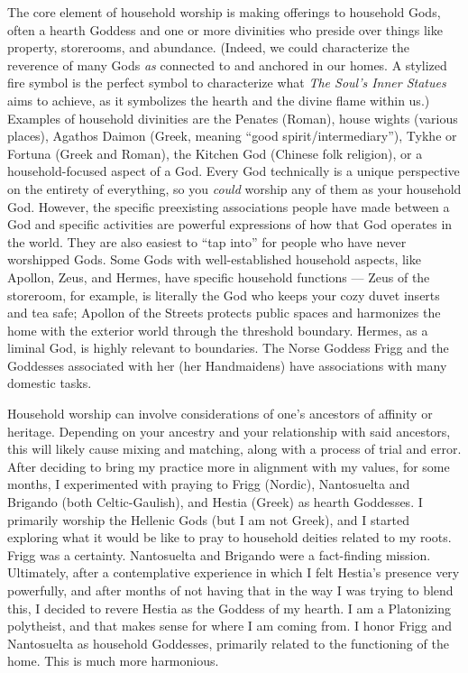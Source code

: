 \documentclass[
]{book}
\begin{document}
The core element of household worship is making offerings to household Gods, often a hearth Goddess and one or more divinities who preside over things like property, storerooms, and abundance. (Indeed, we could characterize the reverence of many Gods \emph{as} connected to and anchored in our homes. A stylized fire symbol is the perfect symbol to characterize what \emph{The Soul's Inner Statues} aims to achieve, as it symbolizes the hearth and the divine flame within us.) Examples of household divinities are the Penates (Roman), house wights (various places), Agathos Daimon (Greek, meaning ``good spirit/intermediary''), Tykhe or Fortuna (Greek and Roman), the Kitchen God (Chinese folk religion), or a household-focused aspect of a God. Every God technically is a unique perspective on the entirety of everything, so you \emph{could} worship any of them as your household God. However, the specific preexisting associations people have made between a God and specific activities are powerful expressions of how that God operates in the world. They are also easiest to ``tap into'' for people who have never worshipped Gods. Some Gods with well-established household aspects, like Apollon, Zeus, and Hermes, have specific household functions --- Zeus of the storeroom, for example, is literally the God who keeps your cozy duvet inserts and tea safe; Apollon of the Streets protects public spaces and harmonizes the home with the exterior world through the threshold boundary. Hermes, as a liminal God, is highly relevant to boundaries. The Norse Goddess Frigg and the Goddesses associated with her (her Handmaidens) have associations with many domestic tasks.

Household worship can involve considerations of one's ancestors of affinity or heritage. Depending on your ancestry and your relationship with said ancestors, this will likely cause mixing and matching, along with a process of trial and error. After deciding to bring my practice more in alignment with my values, for some months, I experimented with praying to Frigg (Nordic), Nantosuelta and Brigando (both Celtic-Gaulish), and Hestia (Greek) as hearth Goddesses. I primarily worship the Hellenic Gods (but I am not Greek), and I started exploring what it would be like to pray to household deities related to my roots. Frigg was a certainty. Nantosuelta and Brigando were a fact-finding mission. Ultimately, after a contemplative experience in which I felt Hestia's presence very powerfully, and after months of not having that in the way I was trying to blend this, I decided to revere Hestia as the Goddess of my hearth. I am a Platonizing polytheist, and that makes sense for where I am coming from. I honor Frigg and Nantosuelta as household Goddesses, primarily related to the functioning of the home. This is much more harmonious.
\end{document}
